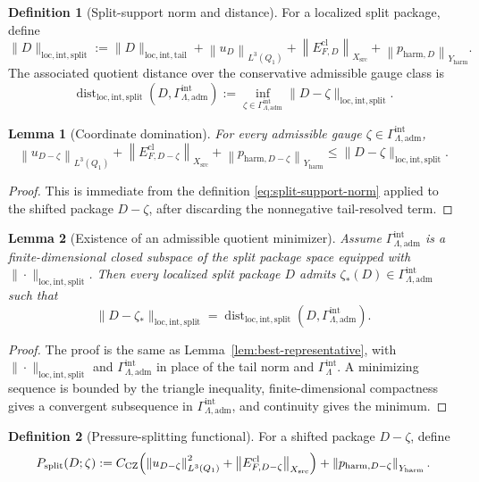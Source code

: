 \documentclass[11pt]{article}
\numberwithin{equation}{section}
\newtheorem{lemma}[lemma]{Lemma}
\theoremstyle{definition}
\newtheorem{definition}[definition]{Definition}
\theoremstyle{remark}
\DeclareMathOperator{\dist}{dist}
\newcommand{\loc}{\mathrm{loc}}
\newcommand{\intg}{\mathrm{int}}
\newcommand{\tail}{\mathrm{tail}}
\newcommand{\spl}{\mathrm{split}}
\newcommand{\adm}{\mathrm{adm}}
\newcommand{\harm}{\mathrm{harm}}
\newcommand{\src}{\mathrm{src}}
\newcommand{\cl}{\mathrm{cl}}
\newcommand{\CZ}{\mathrm{CZ}}
\newcommand{\norm}[2]{\left\|#1\right\|_{#2}}
\newcommand{\Gammaint}{\Gamma^{\intg}_{\Lambda}}
\newcommand{\Gammaadm}{\Gamma^{\intg}_{\Lambda,\adm}}
\begin{document}
\begin{definition}[Split-support norm and distance]\label{def:split-support-norm}
For a localized split package, define
\begin{equation}\label{eq:split-support-norm}
\|D\|_{\loc,\intg,\spl}
:=
\|D\|_{\loc,\intg,\tail}
+
\norm{u_D}{L^3(Q_1)}
+
\norm{E^{\cl}_{F,D}}{X_{\src}}
+
\norm{p_{\harm,D}}{Y_{\harm}}.
\end{equation}
The associated quotient distance over the conservative admissible gauge class is
\[
        \dist_{\loc,\intg,\spl}(D,\Gammaadm)
        :=
        \inf_{\zeta\in\Gammaadm}
        \|D-\zeta\|_{\loc,\intg,\spl}.
\]
\end{definition}

\begin{lemma}[Coordinate domination]\label{lem:coordinate-domination}
For every admissible gauge $\zeta\in\Gammaadm$,
\[
\norm{u_{D-\zeta}}{L^3(Q_1)}
+
\norm{E^{\cl}_{F,D-\zeta}}{X_{\src}}
+
\norm{p_{\harm,D-\zeta}}{Y_{\harm}}
\le
\|D-\zeta\|_{\loc,\intg,\spl}.
\]
\end{lemma}

\begin{proof}
This is immediate from the definition \eqref{eq:split-support-norm} applied to the shifted
package $D-\zeta$, after discarding the nonnegative tail-resolved term.
\end{proof}

\begin{lemma}[Existence of an admissible quotient minimizer]\label{lem:admissible-minimizer}
Assume $\Gammaadm$ is a finite-dimensional closed subspace of the split package space
equipped with $\|\cdot\|_{\loc,\intg,\spl}$.  Then every localized split package $D$ admits
$\zeta_*(D)\in\Gammaadm$ such that
\[
        \|D-\zeta_*\|_{\loc,\intg,\spl}
        =
        \dist_{\loc,\intg,\spl}(D,\Gammaadm).
\]
\end{lemma}

\begin{proof}
The proof is the same as Lemma~\ref{lem:best-representative}, with
$\|\cdot\|_{\loc,\intg,\spl}$ and $\Gammaadm$ in place of the tail norm and $\Gammaint$.
A minimizing sequence is bounded by the triangle inequality, finite-dimensional compactness
gives a convergent subsequence in $\Gammaadm$, and continuity gives the minimum.
\end{proof}

\begin{definition}[Pressure-splitting functional]\label{def:Psplit}
For a shifted package $D-\zeta$, define
\begin{equation}\label{eq:Psplit}
P_{\spl}(D;\zeta)
:=
C_{\CZ}
\Bigl(
\norm{u_{D-\zeta}}{L^3(Q_1)}^2
+
\norm{E^{\cl}_{F,D-\zeta}}{X_{\src}}
\Bigr)
+
\norm{p_{\harm,D-\zeta}}{Y_{\harm}}.
\end{equation}
\end{definition}
\end{document}
